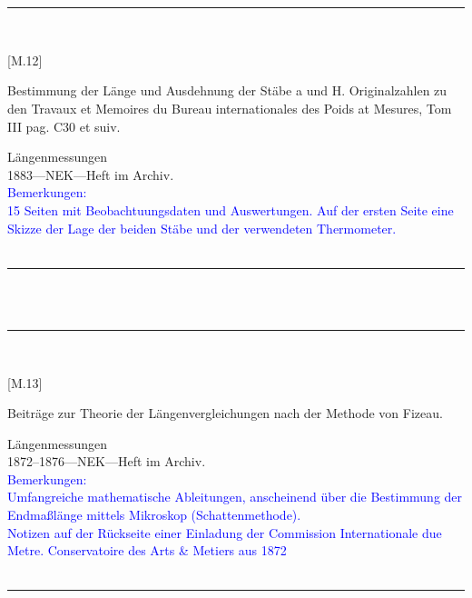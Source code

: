 \\
\vspace*{-2.5pt}\\
\parbox{\textwidth}{%
\rule{\textwidth}{1pt}\vspace*{-3mm}\\
\begin{minipage}[t]{0.22\textwidth}\vspace{0pt}
\Huge\rule[-4mm]{0cm}{1cm}[M.12]
\end{minipage}
\hfill
\begin{minipage}[t]{0.78\textwidth}\vspace{0pt}
\large Bestimmung der Länge und Ausdehnung der Stäbe {\glqq}a{\grqq} und {\glqq}H{\grqq}. Originalzahlen zu den {\glqq}Travaux et Memoires du Bureau internationales des Poids at Mesures, Tom III pag. C30 et suiv.{\grqq}\rule[-2mm]{0mm}{2mm}
\end{minipage}
{\footnotesize\flushright
Längenmessungen\\
}
1883\quad---\quad NEK\quad---\quad Heft im Archiv.\\
\textcolor{blue}{Bemerkungen:\\{}
15 Seiten mit Beobachtuungsdaten und Auswertungen. Auf der ersten Seite eine Skizze der Lage der beiden Stäbe und der verwendeten Thermometer.\\{}
}
\\[-15pt]
\rule{\textwidth}{1pt}
}
\\
\vspace*{-2.5pt}\\
\parbox{\textwidth}{%
\rule{\textwidth}{1pt}\vspace*{-3mm}\\
\begin{minipage}[t]{0.22\textwidth}\vspace{0pt}
\Huge\rule[-4mm]{0cm}{1cm}[M.13]
\end{minipage}
\hfill
\begin{minipage}[t]{0.78\textwidth}\vspace{0pt}
\large Beiträge zur Theorie der Längenvergleichungen nach der Methode von Fizeau.\rule[-2mm]{0mm}{2mm}
\end{minipage}
{\footnotesize\flushright
Längenmessungen\\
}
1872--1876\quad---\quad NEK\quad---\quad Heft im Archiv.\\
\textcolor{blue}{Bemerkungen:\\{}
Umfangreiche mathematische Ableitungen, anscheinend über die Bestimmung der Endmaßlänge mittels Mikroskop (Schattenmethode).\\{}
Notizen auf der Rückseite einer Einladung der {\glqq}Commission Internationale due Metre. Conservatoire des Arts \&{} Metiers aus 1872{\grqq}\\{}
}
\\[-15pt]
\rule{\textwidth}{1pt}
}
